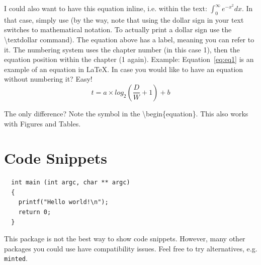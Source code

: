 I could also want to have this equation inline, i.e. within the text: $\int_0^\infty e^{-x^2} dx$.
In that case, simply use \textdollar{} (by the way, note that using the dollar sign in your text switches to mathematical notation. To actually print a dollar sign use the \textbackslash{}textdollar command).
The equation above has a label, meaning you can refer to it. The numbering system uses the chapter number (in this case 1), then the equation position within the chapter (1 again).
Example: Equation~\ref{eq:eq1} is an example of an equation in LaTeX{}.
In case you would like to have an equation without numbering it? Easy!
\begin{equation*}
t = a \times log_{2}(\frac{D}{W} + 1) + b
\end{equation*}

The only difference? Note the \textasteriskcentered symbol in the \textbackslash{}begin\{equation\textbf{\textasteriskcentered}\}.
This also works with Figures and Tables.

\section{Code Snippets}

\begin{lstlisting}
  int main (int argc, char ** argc)
  {
    printf("Hello world!\n");
    return 0;
  }
\end{lstlisting}

This package is not the best way to show code snippets.
However, many other packages you could use have compatibility issues.
Feel free to try alternatives, e.g. \texttt{minted}.

